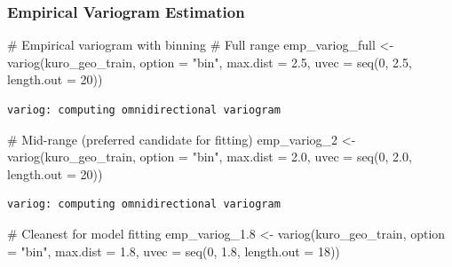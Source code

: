 \documentclass[
  11pt,
]{article}
\newenvironment{Shaded}{\begin{snugshade}}{\end{snugshade}}
\newcommand{\AttributeTok}[1]{\textcolor[rgb]{0.40,0.45,0.13}{#1}}
\newcommand{\CommentTok}[1]{\textcolor[rgb]{0.37,0.37,0.37}{#1}}
\newcommand{\DecValTok}[1]{\textcolor[rgb]{0.68,0.00,0.00}{#1}}
\newcommand{\FloatTok}[1]{\textcolor[rgb]{0.68,0.00,0.00}{#1}}
\newcommand{\FunctionTok}[1]{\textcolor[rgb]{0.28,0.35,0.67}{#1}}
\newcommand{\NormalTok}[1]{\textcolor[rgb]{0.00,0.23,0.31}{#1}}
\newcommand{\OtherTok}[1]{\textcolor[rgb]{0.00,0.23,0.31}{#1}}
\newcommand{\StringTok}[1]{\textcolor[rgb]{0.13,0.47,0.30}{#1}}
\begin{document}
\subsubsection{Empirical Variogram
Estimation}\label{empirical-variogram-estimation}

\begin{Shaded}
\begin{Highlighting}[]
\CommentTok{\# Empirical variogram with binning}
\CommentTok{\# Full range}
\NormalTok{emp\_variog\_full }\OtherTok{\textless{}{-}} \FunctionTok{variog}\NormalTok{(kuro\_geo\_train, }\AttributeTok{option =} \StringTok{"bin"}\NormalTok{, }\AttributeTok{max.dist =} \FloatTok{2.5}\NormalTok{, }\AttributeTok{uvec =} \FunctionTok{seq}\NormalTok{(}\DecValTok{0}\NormalTok{, }\FloatTok{2.5}\NormalTok{, }\AttributeTok{length.out =} \DecValTok{20}\NormalTok{))}
\end{Highlighting}
\end{Shaded}

\begin{verbatim}
variog: computing omnidirectional variogram
\end{verbatim}

\begin{Shaded}
\begin{Highlighting}[]
\CommentTok{\# Mid{-}range (preferred candidate for fitting)}
\NormalTok{emp\_variog\_2 }\OtherTok{\textless{}{-}} \FunctionTok{variog}\NormalTok{(kuro\_geo\_train, }\AttributeTok{option =} \StringTok{"bin"}\NormalTok{, }\AttributeTok{max.dist =} \FloatTok{2.0}\NormalTok{, }\AttributeTok{uvec =} \FunctionTok{seq}\NormalTok{(}\DecValTok{0}\NormalTok{, }\FloatTok{2.0}\NormalTok{, }\AttributeTok{length.out =} \DecValTok{20}\NormalTok{))}
\end{Highlighting}
\end{Shaded}

\begin{verbatim}
variog: computing omnidirectional variogram
\end{verbatim}

\begin{Shaded}
\begin{Highlighting}[]
\CommentTok{\# Cleanest for model fitting}
\NormalTok{emp\_variog\_1}\FloatTok{.8} \OtherTok{\textless{}{-}} \FunctionTok{variog}\NormalTok{(kuro\_geo\_train, }\AttributeTok{option =} \StringTok{"bin"}\NormalTok{, }\AttributeTok{max.dist =} \FloatTok{1.8}\NormalTok{, }\AttributeTok{uvec =} \FunctionTok{seq}\NormalTok{(}\DecValTok{0}\NormalTok{, }\FloatTok{1.8}\NormalTok{, }\AttributeTok{length.out =} \DecValTok{18}\NormalTok{))}
\end{Highlighting}
\end{Shaded}
\end{document}
